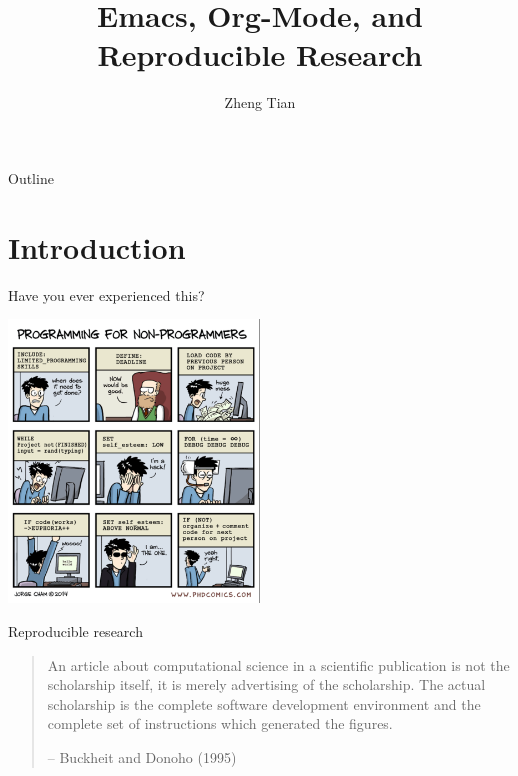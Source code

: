 \documentclass[presentation]{beamer}
\author{Zheng Tian}
\date{}
\title{Emacs, Org-Mode, and Reproducible Research}
\begin{document}
\maketitle
\begin{frame}{Outline}
\setcounter{tocdepth}{1}
\tableofcontents
\end{frame}


\section{Introduction}
\label{sec:org6ff06d5}

\begin{frame}[label={sec:org480454f}]{Have you ever experienced this?}
\begin{center}
\includegraphics[width=0.5\textwidth]{figure/phdcomics.png}
\end{center}
\end{frame}


\begin{frame}[label={sec:org1e557b0}]{Reproducible research}
\begin{quote}
An article about computational science in a scientific publication is
not the scholarship itself, it is merely advertising of the
scholarship. The actual scholarship is the complete software
development environment and the complete set of instructions which
generated the figures.

-- Buckheit and Donoho (1995)
\end{quote}
\end{frame}
\end{document}
